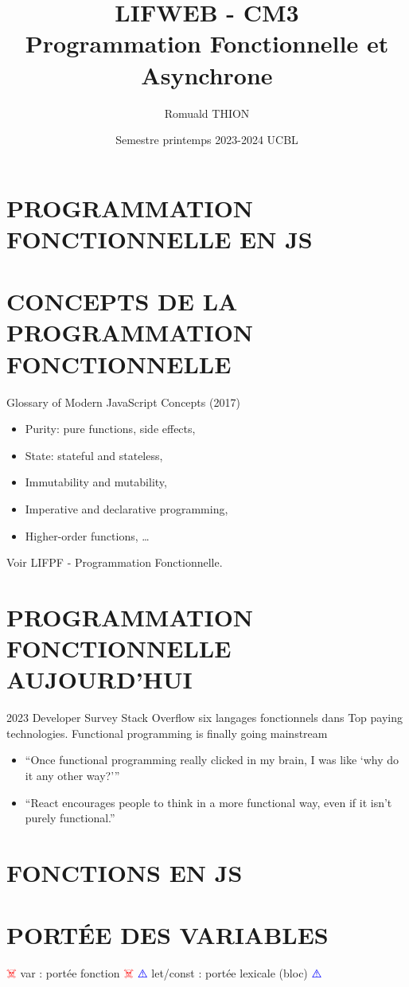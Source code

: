\documentclass{article}
\title{LIFWEB - CM3 \\ Programmation Fonctionnelle et Asynchrone}
\author{Romuald THION}
\date{Semestre printemps 2023-2024 UCBL}
\begin{document}
\maketitle

\section{PROGRAMMATION FONCTIONNELLE EN JS}
\section{CONCEPTS DE LA PROGRAMMATION FONCTIONNELLE}
Glossary of Modern JavaScript Concepts (2017)
\begin{itemize}
    \item Purity: pure functions, side effects,
    \item State: stateful and stateless,
    \item Immutability and mutability,
    \item Imperative and declarative programming,
    \item Higher-order functions, …
\end{itemize}
Voir LIFPF - Programmation Fonctionnelle.

\section{PROGRAMMATION FONCTIONNELLE AUJOURD’HUI}
2023 Developer Survey Stack Overflow
six langages fonctionnels dans Top paying technologies.
Functional programming is finally going mainstream
\begin{itemize}
    \item “Once functional programming really clicked in my brain, I was like ‘why do it any other way?’”
    \item “React encourages people to think in a more functional way, even if it isn’t purely functional.”
\end{itemize}

\section{FONCTIONS EN JS}
\section{PORTÉE DES VARIABLES}
\textcolor{red}{☠️} var : portée fonction \textcolor{red}{☠️}
\newline
\textcolor{blue}{⚠️} let/const : portée lexicale (bloc) \textcolor{blue}{⚠️}
\newline
\end{document}
